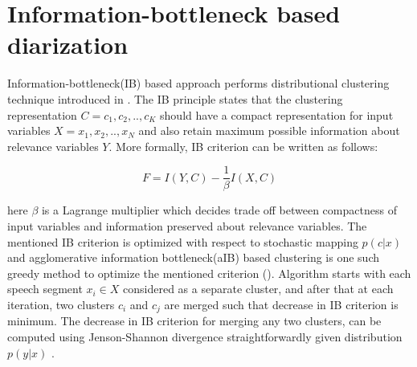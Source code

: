 \documentclass[conference]{IEEEtran}
\begin{document}
\section{Information-bottleneck based diarization}
\label{system}

Information-bottleneck(IB) based approach performs distributional clustering technique introduced in \cite{aIB}. The IB principle states that the clustering representation $C = {c_1,c_2,..,c_K}$ should have a compact representation for input variables $X = {x_1,x_2,..,x_N}$ and also retain maximum possible information about relevance variables $Y$. More formally, IB criterion can be written as follows:

\begin{equation}
\label{eq:aIB}
F = I(Y,C) - \frac{1}{\beta}I(X,C) 
\end{equation} 

here $\beta$ is a Lagrange multiplier which decides trade off between compactness of input variables and information preserved about relevance variables. The mentioned IB criterion is optimized with respect to stochastic mapping $p(c|x)$ and agglomerative information bottleneck(aIB) based clustering is one such greedy method to optimize the mentioned criterion (\cite{aIB}). Algorithm starts with each speech segment $x_i \in X$ considered as a separate cluster, and after that at each iteration, two clusters $c_i$ and $c_j$ are merged such that decrease in IB criterion is minimum. The decrease in IB criterion for merging any two clusters, can be computed using Jenson-Shannon divergence straightforwardly given distribution $p(y|x)$ \cite{aIB2}.

\end{document}
